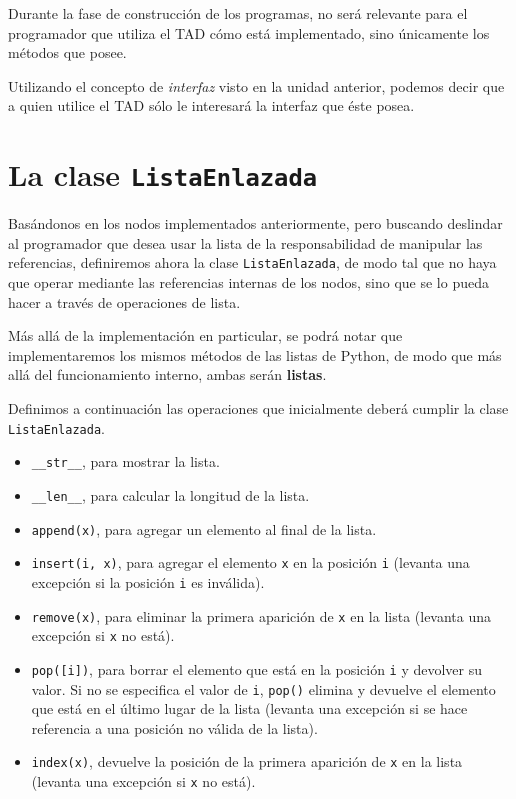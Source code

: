 Durante la fase de construcción de los programas, no será relevante para el
programador que utiliza el TAD cómo está implementado, sino únicamente los
métodos que posee.

\begin{observacion}
Utilizando el concepto de \emph{interfaz} visto en la unidad anterior, podemos
decir que a quien utilice el TAD sólo le interesará la interfaz que éste
posea.
\end{observacion}

\section{La clase {\tt ListaEnlazada}}

Basándonos en los nodos implementados anteriormente, pero buscando
deslindar al programador que desea usar la lista de la responsabilidad de
manipular las referencias, definiremos ahora la clase
\lstinline!ListaEnlazada!, de modo tal que no haya que operar mediante las
referencias internas de los nodos, sino que se lo pueda hacer a través de
operaciones de lista.

Más allá de la implementación en particular, se podrá notar que implementaremos
los mismos métodos de las listas de Python, de modo que más allá del
funcionamiento interno, ambas serán {\bf listas}.

Definimos a continuación las operaciones que inicialmente deberá cumplir la
clase \lstinline!ListaEnlazada!.

\begin{itemize}
\item \lstinline|__str__|, para mostrar la lista.

\item \lstinline|__len__|, para calcular la longitud de la lista.

\item \lstinline|append(x)|, para agregar un elemento al final de la lista.

\item \lstinline|insert(i, x)|, para agregar el elemento \lstinline!x! en la
posición \lstinline!i! (levanta una excepción si la posición \lstinline!i! es
inválida).

\item \lstinline|remove(x)|, para eliminar la primera aparición de
\lstinline!x! en la lista (levanta una excepción si \lstinline!x! no está).

\item \lstinline|pop([i])|, para borrar el elemento que está en la posición
\lstinline!i! y devolver su valor. Si no se especifica el valor de
\lstinline!i!, \lstinline|pop()| elimina y devuelve el elemento que está en
el último lugar de la lista (levanta una excepción si se hace referencia a
una posición no válida de la lista).

\item \lstinline|index(x)|, devuelve la posición de la primera aparición de
\lstinline!x! en la lista (levanta una excepción si \lstinline!x! no está).
\end{itemize}

